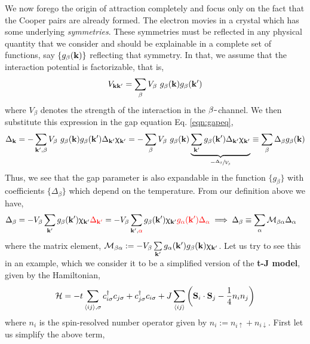 \documentclass{article}
\newcommand{\SH}{\mathcal{H}}
\newcommand{\vk}{\vb{k}}
\newcommand{\sm}{\mathord{\scalebox{0.6}[1]{$-$}}}
\newcommand{\vkd}{\vb{k}'}
\begin{document}
We now forego the origin of attraction completely and focus only on the fact that the Cooper pairs are already formed. The electron movies in a crystal which has some underlying \textit{symmetries}. These symmetries must be reflected in any physical quantity that we consider and should be explainable in a complete set of functions, say $\{g_\beta(\vk)\}$ reflecting that symmetry. In that, we assume that the interaction potential is factorizable, that is,
\begin{equation}
    V_{\vk\vkd} = \sum\limits_{\beta} V_{\beta}\ g_\beta(\vk)g_\beta(\vkd)
\end{equation}
where $V_{\beta}$ denotes the strength of the interaction in the $\beta\sm$channel. We then substitute this expression in the gap equation Eq. \eqref{eqn:gapeq},
\begin{equation}
    \Delta_{\vk} = -\sum\limits_{\vkd,\beta} V_{\beta}\ g_\beta(\vk)g_\beta(\vkd)\Delta_{\vkd}\upchi_{\vkd} =-\sum\limits_{\beta} V_{\beta}\ g_\beta(\vk) \underbrace{\sum\limits_{\vkd} g_\beta(\vkd)\Delta_{\vkd}\upchi_{\vkd}}_{-\sfrac{\Delta_{\beta}}{V_{\beta}}}\equiv \sum\limits_{\beta}\Delta_{\beta}g_{\beta}(\vk)
\end{equation}
Thus, we see that the gap parameter is also expandable in the function $\{g_{\beta}\}$ with coefficients $\{\Delta_{\beta}\}$ which depend on the temperature. From our definition above we have,
\begin{align}
    \begin{split}
        \Delta_{\beta} &= -V_\beta\sum\limits_{\vkd}g_\beta(\vkd)\upchi_{\vkd}\mathcolor{red}{\Delta_{\vkd}}= -V_\beta\sum\limits_{\vkd,\mathcolor{red}{\alpha}}g_\beta(\vkd)\upchi_{\vkd}\mathcolor{red}{g_{\alpha}(\vkd)\Delta_{\alpha}}\implies \Delta_{\beta}\equiv \sum\limits_{\alpha}\mathcal{M}_{\beta\alpha}\Delta_{\alpha}
    \end{split}
\end{align}
where the matrix element, $\mathcal{M}_{\beta\alpha} := -V_\beta\sum\limits_{\vkd} g_{\alpha}(\vkd)g_{\beta}(\vk)\upchi_{\vkd}$. Let us try to see this in an example, which we consider it to be a simplified version of the \textbf{t-J model}, given by the Hamiltonian,
\begin{equation}
    \SH = -t \sum\limits_{\expval{ij}, \sigma} c_{i\sigma}^\dagger c_{j\sigma} + c_{j\sigma}^\dagger c_{i\sigma} + J\sum\limits_{\expval{ij}} \qty(\vb{S}_{i}\cdot \vb{S}_j - \frac{1}{4}n_{i}n_{j} )
\end{equation}
where $n_i$ is the spin-resolved number operator given by $n_i := n_{i\uparrow} + n_{i\downarrow}$. First let us simplify the above term,
\end{document}
